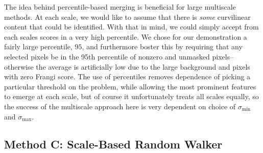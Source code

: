 The idea behind percentile-based merging is beneficial for large multiscale methods. At each scale, we would like to assume that there is \textit{some} curvilinear content that could be identified. With that in mind, we could simply accept from each scales scores in a very high percentile. We chose for our demonstration a fairly large percentile, $95$, and furthermore boster this by requiring that any selected pixels be in the 95th percentile of nonzero and unmasked pixels--otherwise the average is artificially low due to the large background and pixels with zero Frangi score. The use of percentiles removes dependence of picking a particular threshold on the problem, while allowing the most prominent features to emerge at each scale, but of course it unfortunately treats all scales equally, so the success of the multiscale approach here is very dependent on choice of $\sigma_{\min}$ and $\sigma_{\max}$.

\subsection{Method C: Scale-Based Random Walker}

